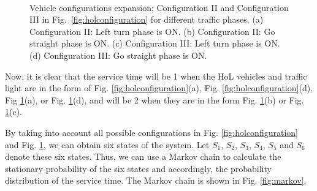 \documentclass[conference]{IEEEtran}
\begin{document}
\begin{figure}[t!]
\vspace{10pt}
\begin{center}
 \hspace{10pt}
 \\
 \hspace{10pt}
\end{center}
\begin{center}
\vspace{-5pt}
\caption{\label{fig:holconfig_lights} Vehicle configurations expansion; Configuration II and Configuration III in Fig.~\ref{fig:holconfiguration} for different traffic phases. (a) Configuration II: Left turn phase is ON. (b) Configuration II: Go straight phase is ON. (c) Configuration III: Left turn phase is ON. (d) Configuration III: Go straight phase is ON.}
\vspace{-25pt}
\end{center}
\end{figure}

Now, it is clear that the service time will be 1 when the HoL vehicles and traffic light are in the form of Fig. \ref{fig:holconfiguration}(a), Fig. \ref{fig:holconfiguration}(d), Fig \ref{fig:holconfig_lights}(a), or Fig. \ref{fig:holconfig_lights}(d), and will be 2 when they are in the form Fig. \ref{fig:holconfig_lights}(b) or Fig. \ref{fig:holconfig_lights}(c).

By taking into account all possible configurations in Fig. \ref{fig:holconfiguration} and Fig. \ref{fig:holconfig_lights}, we can obtain six states of the system. Let $S_1$, $S_2$, $S_3$, $S_4$, $S_5$ and $S_6$ denote these six states. Thus, we can use a Markov chain to calculate the stationary probability of the six states and accordingly, the probability distribution of the service time. The Markov chain is shown in Fig. \ref{fig:markov}.
\end{document}
